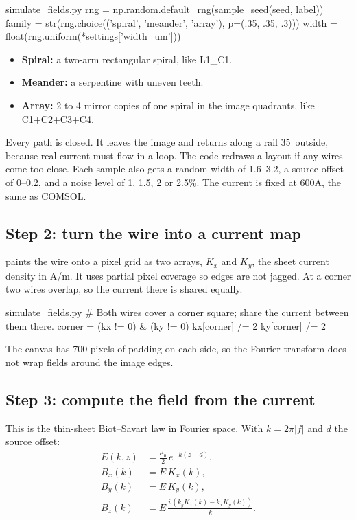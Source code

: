 \begin{code*}{simulate_fields.py}
    rng = np.random.default_rng(sample_seed(seed, label))
    family = str(rng.choice(('spiral', 'meander', 'array'), p=(.35, .35, .3)))
    width = float(rng.uniform(*settings['width_um']))
\end{code*}

\begin{itemize}
\item \textbf{Spiral:} a two-arm rectangular spiral, like L1\_C1.
\item \textbf{Meander:} a serpentine with uneven teeth.
\item \textbf{Array:} 2 to 4 mirror copies of one spiral in the image quadrants, like C1+C2+C3+C4.
\end{itemize}

Every path is closed. It leaves the image and returns along a rail 35\um\ outside, because real
current must flow in a loop. The code redraws a layout if any wires come too close. Each sample also
gets a random width of 1.6--3.2\um, a source offset of 0--0.2\um, and a noise level of 1, 1.5, 2 or
2.5\%. The current is fixed at 600\textmu A, the same as COMSOL.

\subsection*{Step 2: turn the wire into a current map}

 paints the wire onto a pixel grid as two arrays, $K_x$ and $K_y$, the sheet current
density in A/m. It uses partial pixel coverage so edges are not jagged. At a corner two wires overlap,
so the current there is shared equally.

\begin{code*}{simulate_fields.py}
    # Both wires cover a corner square; share the current between them there.
    corner = (kx != 0) & (ky != 0)
    kx[corner] /= 2
    ky[corner] /= 2
\end{code*}

The canvas has 700 pixels of padding on each side, so the Fourier transform does not wrap
fields around the image edges.

\subsection*{Step 3: compute the field from the current}

This is the thin-sheet Biot--Savart law in Fourier space. With $k=2\pi|f|$ and $d$ the source offset:
\begin{align}
E(k,z) &= \frac{\mu_0}{2}\, e^{-k(z+d)},\\
B_x(k) &= E\, K_x(k),\\
B_y(k) &= E\, K_y(k),\\
B_z(k) &= E\, \frac{i\,(k_y K_x(k) - k_x K_y(k))}{k}.
\end{align}

